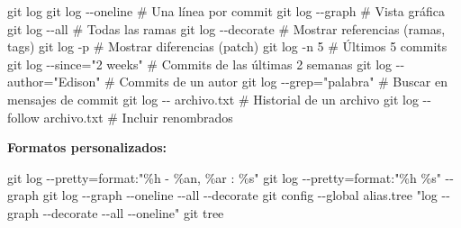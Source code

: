 \documentclass[
  doc,
  floatsintext,
  longtable,
  a4paper,
  nolmodern,
  notxfonts,
  notimes,
  12pt,
  colorlinks=true,linkcolor=blue,citecolor=blue,urlcolor=blue]{apa7}
\newenvironment{Shaded}{\begin{snugshade}}{\end{snugshade}}
\newcommand{\AttributeTok}[1]{\textcolor[rgb]{0.40,0.45,0.13}{#1}}
\newcommand{\CommentTok}[1]{\textcolor[rgb]{0.37,0.37,0.37}{#1}}
\newcommand{\FunctionTok}[1]{\textcolor[rgb]{0.28,0.35,0.67}{#1}}
\newcommand{\NormalTok}[1]{\textcolor[rgb]{0.00,0.23,0.31}{#1}}
\newcommand{\OperatorTok}[1]{\textcolor[rgb]{0.37,0.37,0.37}{#1}}
\newcommand{\StringTok}[1]{\textcolor[rgb]{0.13,0.47,0.30}{#1}}
\begin{document}
\begin{Shaded}
\begin{Highlighting}[]
\FunctionTok{git}\NormalTok{ log}
\FunctionTok{git}\NormalTok{ log }\AttributeTok{{-}{-}oneline}          \CommentTok{\# Una línea por commit}
\FunctionTok{git}\NormalTok{ log }\AttributeTok{{-}{-}graph}            \CommentTok{\# Vista gráfica}
\FunctionTok{git}\NormalTok{ log }\AttributeTok{{-}{-}all}              \CommentTok{\# Todas las ramas}
\FunctionTok{git}\NormalTok{ log }\AttributeTok{{-}{-}decorate}         \CommentTok{\# Mostrar referencias (ramas, tags)}
\FunctionTok{git}\NormalTok{ log }\AttributeTok{{-}p}                 \CommentTok{\# Mostrar diferencias (patch)}
\FunctionTok{git}\NormalTok{ log }\AttributeTok{{-}n}\NormalTok{ 5               }\CommentTok{\# Últimos 5 commits}
\FunctionTok{git}\NormalTok{ log }\AttributeTok{{-}{-}since}\OperatorTok{=}\StringTok{"2 weeks"}  \CommentTok{\# Commits de las últimas 2 semanas}
\FunctionTok{git}\NormalTok{ log }\AttributeTok{{-}{-}author}\OperatorTok{=}\StringTok{"Edison"}  \CommentTok{\# Commits de un autor}
\FunctionTok{git}\NormalTok{ log }\AttributeTok{{-}{-}grep}\OperatorTok{=}\StringTok{"palabra"}   \CommentTok{\# Buscar en mensajes de commit}
\FunctionTok{git}\NormalTok{ log }\AttributeTok{{-}{-}}\NormalTok{ archivo.txt     }\CommentTok{\# Historial de un archivo}
\FunctionTok{git}\NormalTok{ log }\AttributeTok{{-}{-}follow}\NormalTok{ archivo.txt  }\CommentTok{\# Incluir renombrados}
\end{Highlighting}
\end{Shaded}

\textbf{Formatos personalizados:}

\begin{Shaded}
\begin{Highlighting}[]
\FunctionTok{git}\NormalTok{ log }\AttributeTok{{-}{-}pretty}\OperatorTok{=}\NormalTok{format:}\StringTok{"\%h {-} \%an, \%ar : \%s"}
\FunctionTok{git}\NormalTok{ log }\AttributeTok{{-}{-}pretty}\OperatorTok{=}\NormalTok{format:}\StringTok{"\%h \%s"} \AttributeTok{{-}{-}graph}
\FunctionTok{git}\NormalTok{ log }\AttributeTok{{-}{-}graph} \AttributeTok{{-}{-}oneline} \AttributeTok{{-}{-}all} \AttributeTok{{-}{-}decorate}
\FunctionTok{git}\NormalTok{ config }\AttributeTok{{-}{-}global}\NormalTok{ alias.tree }\StringTok{"log {-}{-}graph {-}{-}decorate {-}{-}all {-}{-}oneline"}
\FunctionTok{git}\NormalTok{ tree}
\end{Highlighting}
\end{Shaded}
\end{document}
